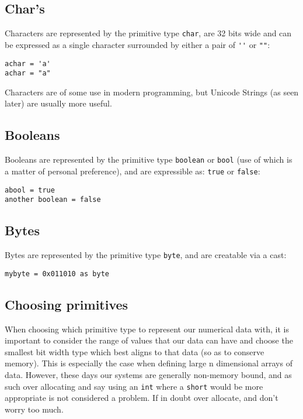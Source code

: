 \documentclass[conc-doc]{subfiles}
\begin{document}
\subsection{Char's}

Characters are represented by the primitive type \lstinline{char}, are 32 bits wide and can be expressed as a single character surrounded by either a pair of \lstinline{''} or \lstinline{""}:

\begin{lstlisting}
achar = 'a'
achar = "a"
\end{lstlisting}

Characters are of some use in modern programming, but Unicode Strings (as seen later) are usually more useful.

\subsection{Booleans}

Booleans are represented by the primitive type \lstinline{boolean} or \lstinline{bool} (use of which is a matter of personal preference), and are expressible as: \lstinline{true} or \lstinline{false}:
\begin{lstlisting}
abool = true
another boolean = false
\end{lstlisting}

\subsection{Bytes}
Bytes are represented by the primitive type \lstinline{byte}, and are creatable via a cast:
\begin{lstlisting}
mybyte = 0x011010 as byte
\end{lstlisting}

\subsection{Choosing primitives}
When choosing which primitive type to represent our numerical data with, it is important to consider the range of values that our data can have and choose the smallest bit width type which best aligns to that data (so as to conserve memory). This is especially the case when defining large n dimensional arrays of data. However, these days our systems are generally non-memory bound, and as such over allocating and say using an \lstinline{int} where a \lstinline{short} would be more appropriate is not considered a problem. If in doubt over allocate, and don't worry too much.
\end{document}
